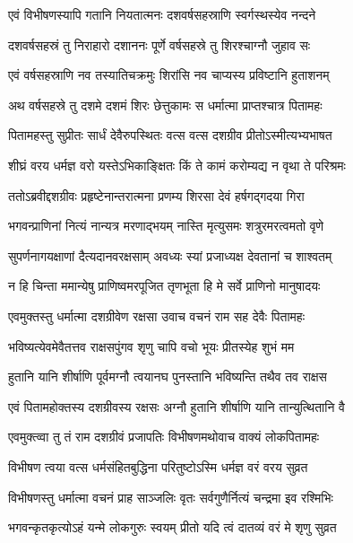 \twolineshloka
{एवं विभीषणस्यापि गतानि नियतात्मनः}
{दशवर्षसहस्राणि स्वर्गस्थस्येव नन्दने} %

\twolineshloka
{दशवर्षसहस्रं तु निराहारो दशाननः}
{पूर्णे वर्षसहस्रे तु शिरश्चाग्नौ जुहाव सः} %

\twolineshloka
{एवं वर्षसहस्राणि नव तस्यातिचक्रमुः}
{शिरांसि नव चाप्यस्य प्रविष्टानि हुताशनम्} %

\twolineshloka
{अथ वर्षसहस्रे तु दशमे दशमं शिरः}
{छेत्तुकामः स धर्मात्मा प्राप्तश्चात्र पितामहः} %

\twolineshloka
{पितामहस्तु सुप्रीतः सार्धं देवैरुपस्थितः}
{वत्स वत्स दशग्रीव प्रीतोऽस्मीत्यभ्यभाषत} %

\twolineshloka
{शीघ्रं वरय धर्मज्ञ वरो यस्तेऽभिकाङ्क्षितः}
{किं ते कामं करोम्यद्य न वृथा ते परिश्रमः} %

\twolineshloka
{ततोऽब्रवीद्दशग्रीवः प्रहृष्टेनान्तरात्मना}
{प्रणम्य शिरसा देवं हर्षगद्गदया गिरा} %

\twolineshloka
{भगवन्प्राणिनां नित्यं नान्यत्र मरणाद्भयम्}
{नास्ति मृत्युसमः शत्रुरमरत्वमतो वृणे} %

\twolineshloka
{सुपर्णनागयक्षाणां दैत्यदानवरक्षसाम्}
{अवध्यः स्यां प्रजाध्यक्ष देवतानां च शाश्वतम्} %

\twolineshloka
{न हि चिन्ता ममान्येषु प्राणिष्वमरपूजित}
{तृणभूता हि मे सर्वे प्राणिनो मानुषादयः} %

\twolineshloka
{एवमुक्तस्तु धर्मात्मा दशग्रीवेण रक्षसा}
{उवाच वचनं राम सह देवैः पितामहः} %

\twolineshloka
{भविष्यत्येवमेवैतत्तव राक्षसपुंगव}
{शृणु चापि वचो भूयः प्रीतस्येह शुभं मम} %

\twolineshloka
{हुतानि यानि शीर्षाणि पूर्वमग्नौ त्वयानघ}
{पुनस्तानि भविष्यन्ति तथैव तव राक्षस} %

\twolineshloka
{एवं पितामहोक्तस्य दशग्रीवस्य रक्षसः}
{अग्नौ हुतानि शीर्षाणि यानि तान्युत्थितानि वै} %

\twolineshloka
{एवमुक्त्व्वा तु तं राम दशग्रीवं प्रजापतिः}
{विभीषणमथोवाच वाक्यं लोकपितामहः} %

\twolineshloka
{विभीषण त्वया वत्स धर्मसंहितबुद्धिना}
{परितुष्टोऽस्मि धर्मज्ञ वरं वरय सुव्रत} %

\twolineshloka
{विभीषणस्तु धर्मात्मा वचनं प्राह साञ्जलिः}
{वृतः सर्वगुणैर्नित्यं चन्द्रमा इव रश्मिभिः} %

\twolineshloka
{भगवन्कृतकृत्योऽहं यन्मे लोकगुरुः स्वयम्}
{प्रीतो यदि त्वं दातव्यं वरं मे शृणु सुव्रत} %

